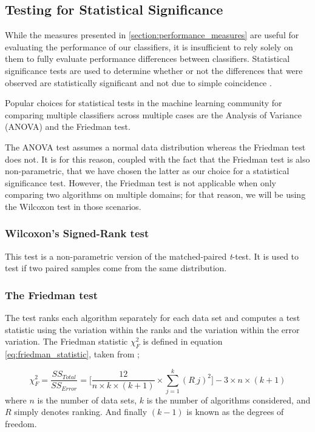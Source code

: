 \subsection{Testing for Statistical Significance}
While the measures presented in \ref{section:performance_measures} are useful for evaluating the performance of our classifiers, it is insufficient to rely solely on them to fully evaluate performance differences between classifiers. Statistical significance tests are used to determine whether or not the differences that were observed are statistically significant and not due to simple coincidence \cite{japkowicz2011evaluating}.

Popular choices for statistical tests in the machine learning community for comparing multiple classifiers across multiple cases are the Analysis of Variance (ANOVA) and the Friedman test. 

The ANOVA test assumes a normal data distribution whereas the Friedman test does not. It is for this reason, coupled with the fact that the Friedman test is also non-parametric, that we have chosen the latter as our choice for a statistical significance test. However, the Friedman test is not applicable when only comparing two algorithms on multiple domains; for that reason, we will be using the Wilcoxon test in those scenarios.

\subsubsection{Wilcoxon's Signed-Rank test}
This test is a non-parametric version of the matched-paired \textit{t}-test. It is used to test if two paired samples come from the same distribution.

\subsubsection{The Friedman test}
The test ranks each algorithm separately for each data set and computes a test statistic using the variation within the ranks and the variation within the error variation. The Friedman statistic $\chi^2_F$ is defined in equation \ref{eq:friedman_statistic}, taken from \cite{japkowicz2011evaluating};

\begin{equation}
\label{eq:friedman_statistic}
\chi^2_F = \frac{SS_{Total}}{SS_{Error}}=\bigg[\frac{12}{n\times k\times(k+1)}\times\sum_{j=1}^k(R_.j)^2\bigg]-3\times n \times (k+1)
\end{equation}where $n$ is the number of data sets, $k$ is the number of algorithms considered, and $R$ simply denotes ranking. And finally $(k-1)$ is known as the degrees of freedom.

